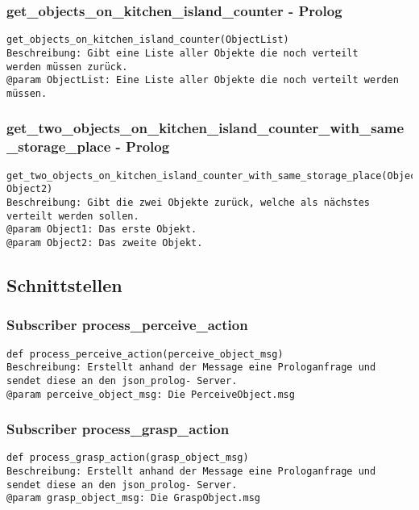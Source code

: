 \documentclass{suturo}
\begin{document}
\subsubsection{get\_objects\_on\_kitchen\_island\_counter - Prolog}
\begin{verbatim}
get_objects_on_kitchen_island_counter(ObjectList)
Beschreibung: Gibt eine Liste aller Objekte die noch verteilt
werden müssen zurück.
@param ObjectList: Eine Liste aller Objekte die noch verteilt werden müssen.
\end{verbatim}

\subsubsection{get\_two\_objects\_on\_kitchen\_island\_counter\_with\_same\_storage\_place - Prolog}
\begin{verbatim}
get_two_objects_on_kitchen_island_counter_with_same_storage_place(Object1, Object2)
Beschreibung: Gibt die zwei Objekte zurück, welche als nächstes verteilt werden sollen.
@param Object1: Das erste Objekt.
@param Object2: Das zweite Objekt.
\end{verbatim}

\subsection*{Schnittstellen}

\subsubsection*{Subscriber process\_perceive\_action}
\begin{verbatim}
def process_perceive_action(perceive_object_msg)
Beschreibung: Erstellt anhand der Message eine Prologanfrage und
sendet diese an den json_prolog- Server. 
@param perceive_object_msg: Die PerceiveObject.msg
\end{verbatim}

\subsubsection*{Subscriber process\_grasp\_action}
\begin{verbatim}
def process_grasp_action(grasp_object_msg)
Beschreibung: Erstellt anhand der Message eine Prologanfrage und
sendet diese an den json_prolog- Server. 
@param grasp_object_msg: Die GraspObject.msg
\end{verbatim}
\end{document}

